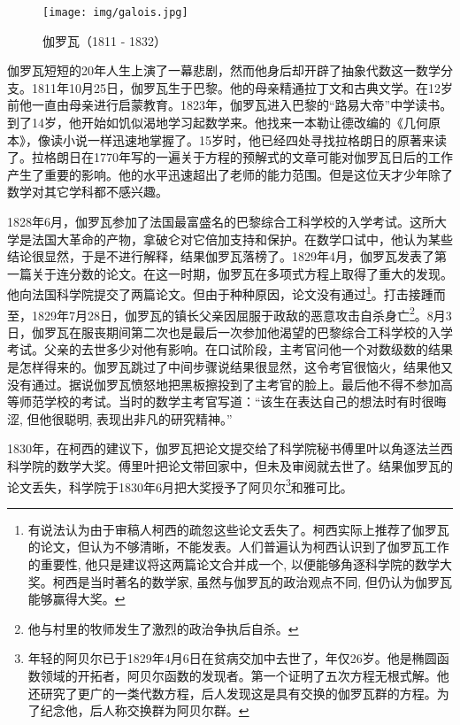 \documentclass[b5paper]{ctexart}
\begin{document}
\begin{figure}[htbp]
 \centering
 \texttt{[image: img/galois.jpg]}
 \captionsetup{labelformat=empty}
 \caption{伽罗瓦（1811 - 1832）}
 \label{fig:Galois}
\end{figure}

伽罗瓦短短的20年人生上演了一幕悲剧，然而他身后却开辟了抽象代数这一数学分支。1811年10月25日，伽罗瓦生于巴黎。他的母亲精通拉丁文和古典文学。在12岁前他一直由母亲进行启蒙教育。1823年，伽罗瓦进入巴黎的“路易大帝”中学读书。到了14岁，他开始如饥似渴地学习起数学来。他找来一本勒让德改编的《几何原本》，像读小说一样迅速地掌握了。15岁时，他已经四处寻找拉格朗日的原著来读了。拉格朗日在1770年写的一遍关于方程的预解式的文章可能对伽罗瓦日后的工作产生了重要的影响。他的水平迅速超出了老师的能力范围。但是这位天才少年除了数学对其它学科都不感兴趣。

1828年6月，伽罗瓦参加了法国最富盛名的巴黎综合工科学校的入学考试。这所大学是法国大革命的产物，拿破仑对它倍加支持和保护。在数学口试中，他认为某些结论很显然，于是不进行解释，结果伽罗瓦落榜了。1829年4月，伽罗瓦发表了第一篇关于连分数的论文。在这一时期，伽罗瓦在多项式方程上取得了重大的发现。他向法国科学院提交了两篇论文。但由于种种原因，论文没有通过\footnote{有说法认为由于审稿人柯西的疏忽这些论文丢失了。柯西实际上推荐了伽罗瓦的论文，但认为不够清晰，不能发表。人们普遍认为柯西认识到了伽罗瓦工作的重要性, 他只是建议将这两篇论文合并成一个, 以便能够角逐科学院的数学大奖。柯西是当时著名的数学家, 虽然与伽罗瓦的政治观点不同, 但仍认为伽罗瓦能够赢得大奖。\cite{Wiki-Galois}}。打击接踵而至，1829年7月28日，伽罗瓦的镇长父亲因屈服于政敌的恶意攻击自杀身亡\footnote{他与村里的牧师发生了激烈的政治争执后自杀\cite{Wiki-Galois}。}。8月3日，伽罗瓦在服丧期间第二次也是最后一次参加他渴望的巴黎综合工科学校的入学考试。父亲的去世多少对他有影响。在口试阶段，主考官问他一个对数级数的结果是怎样得来的。伽罗瓦跳过了中间步骤说结果很显然，这令考官很恼火，结果他又没有通过。据说伽罗瓦愤怒地把黑板擦投到了主考官的脸上。最后他不得不参加高等师范学校的考试。当时的数学主考官写道：“该生在表达自己的想法时有时很晦涩, 但他很聪明, 表现出非凡的研究精神。”

1830年，在柯西的建议下，伽罗瓦把论文提交给了科学院秘书傅里叶以角逐法兰西科学院的数学大奖。傅里叶把论文带回家中，但未及审阅就去世了。结果伽罗瓦的论文丢失，科学院于1830年6月把大奖授予了阿贝尔\footnote{年轻的阿贝尔已于1829年4月6日在贫病交加中去世了，年仅26岁。他是椭圆函数领域的开拓者，阿贝尔函数的发现者。第一个证明了五次方程无根式解。他还研究了更广的一类代数方程，后人发现这是具有交换的伽罗瓦群的方程。为了纪念他，后人称交换群为阿贝尔群。}和雅可比\cite{HanXueTao2009}。
\end{document}
